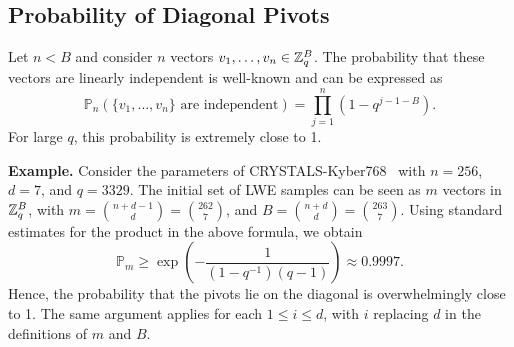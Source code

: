 







\subsection{Probability of Diagonal Pivots}

Let \(n < B\) and consider \(n\) vectors \(v_1,\dots,v_n \in \mathbb{Z}_q^B\). 
The probability that these vectors are linearly independent is well-known and can be expressed as
\begin{equation}\label{pivots}
\mathbb{P}_n(\{v_1,\dots,v_n\} \text{ are independent}) 
= \prod_{j=1}^{n} \left(1 - q^{j-1-B}\right).
\end{equation}
For large \(q\), this probability is extremely close to 1.  

\noindent
\textbf{Example.} 
Consider the parameters of CRYSTALS-Kyber768~\cite{NISTPQC:CRYSTALS-KYBER22} with \(n = 256\), \(d = 7\), and \(q = 3329\). 
The initial set of LWE samples can be seen as \(m\) vectors in \(\mathbb{Z}_q^B\), with $m = \binom{n+d-1}{d} = \binom{262}{7}$, and \(B = \binom{n+d}{d} = \binom{263}{7} \).
Using standard estimates for the product in the above formula, we obtain
\begin{equation*}
\mathbb{P}_m \ge \exp\left(-\frac{1}{(1-q^{-1})(q-1)}\right) \approx 0.9997.
\end{equation*}
Hence, the probability that the pivots lie on the diagonal is overwhelmingly close to 1. 
The same argument applies for each $1 \le i \le d$, with $i$ replacing $d$ in the definitions of $m$ and $B$.

